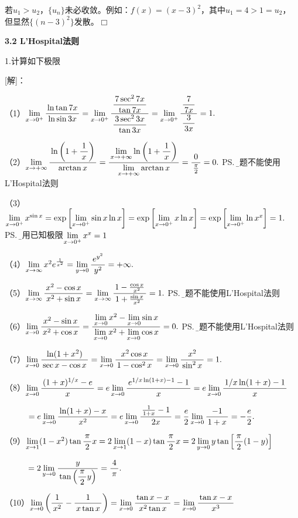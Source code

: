 若$u_1>u_2$，$\{u_n\}$未必收敛。例如：$f(x)=(x-3)^2$，其中$u_1=4>1=u_2$，
但显然$\{(n-3)^2\}$发散。\hfill$\Box$

\begin{center}
	\bf 3.2 L'Hospital法则
\end{center}

\bigskip

1.计算如下极限

[解]：

（1）$\limx{0^+}\df{\ln\tan 7x}{\ln\sin 3x}=\limx{0^+}\df{\df{7\sec^27x}{\tan7x}}{\df{3\sec^23x}{\tan3x}}
=\limx{0^+}\df{\df7{7x}}{\df3{3x}}=1.$

（2）$\limx{+\infty}\df{\ln\left(1+\df1x\right)}{\arctan x}
=\df{\limx{+\infty}\ln\left(1+\df1x\right)}{\limx{+\infty}\arctan
x}=\df{0}{\frac{\pi}2}=0.$
\ps{\b 本题不能使用L'Hospital法则}

（3）$\limx{0^+}x^{\sin x}=\exp\left[\limx{0^+}\sin x\ln x\right]
=\exp\left[\limx{0^+}x\ln x\right]=\exp\left[\limx{0^+}\ln x^x\right]
=1.$
\ps{\b 使用已知极限$\limx{0^+}x^x=1$}

（4）$\limx{\infty}x^2e^{\frac1{x^2}}
=\lim\limits_{y\to0}\df{e^{y^2}}{y^2}
=+\infty.$

（5）$\limx{\infty}\df{x^2-\cos x}{x^2+\sin x}
=\limx{\infty}\df{1-\frac{\cos x}{x^2}}{1+\frac{\sin x}{x^2}}=1.$
\ps{\b 本题不能使用L'Hospital法则}

（6）$\limx{0}\df{x^2-\sin x}{x^2+\cos x}
=\df{\limx{0}x^2-\limx{0}\sin x}{\limx{0}x^2+\limx{0}\cos x}=0.$
\ps{\b 本题不能使用L'Hospital法则}

（7）$\limx{0}\df{\ln(1+x^2)}{\sec x-\cos x}
=\limx{0}\df{x^2\cos x}{1-\cos^2 x}
=\limx{0}\df{x^2}{\sin^2 x}=1.$

（8）$\limx{0}\df{(1+x)^{1/x}-e}{x}
=e\limx{0}\df{e^{1/x\ln(1+x)-1}-1}{x}
=e\limx{0}\df{1/x\ln(1+x)-1}{x}$

$\hspace{1cm} =e\limx{0}\df{\ln(1+x)-x}{x^2}
=e\limx{0}\df{\frac1{1+x}-1}{2x}
=\frac e2\limx{0}\df{-1}{1+x}=-\frac e2.
$
 
（9）$\limx{1}(1-x^2)\tan\df{\pi}{2}x
=2\limx{1}(1-x)\tan\df{\pi}{2}x
=2\lim\limits_{y\to0}y\tan\left[\df{\pi}2(1-y)\right]$

$\hspace{1cm}
=2\lim\limits_{y\to0}\df y{\tan\left(\df{\pi}2y\right)}
=\df4{\pi}.$
 
（10）$\limx{0}\left(\df 1{x^2}-\df 1{x\tan x}\right)
=\limx{0}\df {\tan x-x}{x^2\tan x}
=\limx{0}\df {\tan x-x}{x^3}$

